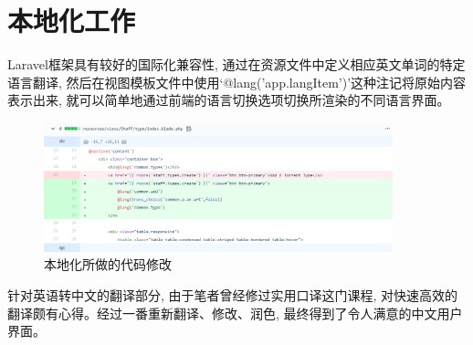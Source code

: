 
\section{本地化工作}

Laravel框架具有较好的国际化兼容性, 通过在资源文件中定义相应英文单词的特定语言翻译, 然后在视图模板文件中使用`@lang('app.langItem')'这种注记将原始内容表示出来, 就可以简单地通过前端的语言切换选项切换所渲染的不同语言界面。

\begin{figure}[ht]
    \centering
    \includegraphics[width=0.9\textwidth]{support-files/4.2-git-diff.png}
    \caption{本地化所做的代码修改}
    \label{fig:localdiff}
\end{figure}


针对英语转中文的翻译部分, 由于笔者曾经修过实用口译这门课程, 对快速高效的翻译颇有心得。经过一番重新翻译、修改、润色, 最终得到了令人满意的中文用户界面。

